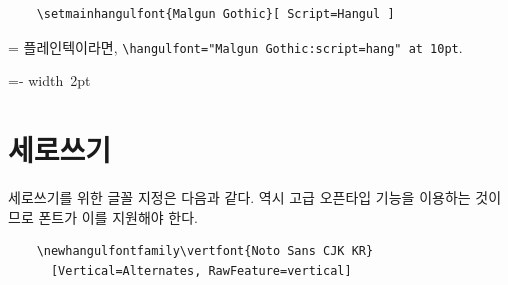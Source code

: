 \documentclass[a4paper]{article}
\def\grayvrule{{\color{white!80!black}\vrule width 2pt}}
\newenvironment{plaintex}
  {\par\medskip
    \setbox0=\vbox\bgroup\kern5pt\leftskip15pt \small
    \parindent0pt }
  {\par \kern5pt\egroup
    \dimen0=\dimexpr\pagegoal-\pagetotal\relax
    \ifdim\dimen0<\baselineskip\relax \dimen0\maxdimen \fi
    \ifdim\ht0<\dimen0
      \hbox{\grayvrule \box0}%
    \else
      \setbox2=\vsplit0 to\dimen0
      \lineskip0pt
      \ifvoid2 \else\hbox{\grayvrule \box2}\fi
      \ifvoid0 \else\hbox{\grayvrule \box0}\fi
    \fi \par\smallskip
  }
\def\cs#1{\texttt{\textbackslash #1}}
\begin{document}
\begin{verbatim}
    \setmainhangulfont{Malgun Gothic}[ Script=Hangul ]
\end{verbatim}
\begin{plaintex}
플레인텍이라면, \cs{hangulfont="Malgun Gothic:script=hang" at 10pt}.
\end{plaintex}

\section{세로쓰기}\label{sec:verttype}

세로쓰기를 위한 글꼴 지정은 다음과 같다.
역시 고급 오픈타입 기능을 이용하는 것이므로 폰트가 이를 지원해야 한다.
\begin{verbatim}
    \newhangulfontfamily\vertfont{Noto Sans CJK KR}
      [Vertical=Alternates, RawFeature=vertical]
\end{verbatim}
\end{document}

